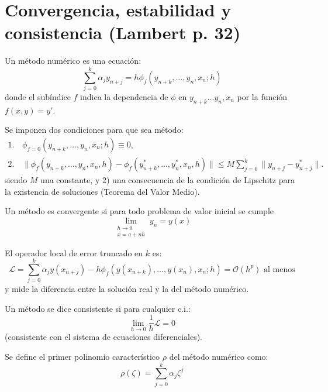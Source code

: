 \section{Convergencia, estabilidad y consistencia (Lambert p. 32)}

\begin{defi}
    Un método numérico es una ecuación:
\begin{equation}
    \sum_{j=0}^k \alpha_j y_{n+j} = h \phi_f(y_{n+k}, \dots, y_n, x_n; h) \tag{2.4}
\end{equation}
donde el subíndice $f$ indica la dependencia de $\phi$ en $y_{n+k} \dots y_n, x_n$ por la función $f(x,y) = y'$.

Se imponen dos condiciones para que sea método:
\begin{equation}
\begin{aligned}
1. & \, \phi_{f=0}(y_{n+k}, \dots, y_n, x_n; h) \equiv 0, \\
2. & \, \displaystyle \|\phi_f(y_{n+k}, \dots, y_n, x_n, h) - \phi_f(y^*_{n+k}, \dots, y^*_n, x_n, h)\| \le M \sum_{j=0}^k \|y_{n+j} - y^*_{n+j}\|.
\end{aligned}
\tag{2.5}
\end{equation}
 siendo $M$ una constante, y 2) una consecuencia de la condición de Lipschitz para la existencia de soluciones (Teorema del Valor Medio).

\end{defi} 
\begin{defi}
    Un método es convergente si para todo problema de valor inicial se cumple
$$ \lim_{\substack{h \to 0 \\ x = a+nh}} y_n = y(x) $$
\end{defi} 

\begin{defi}
    El operador local de error truncado en $k$ es:
$$ \mathscr L = \sum_{j=0}^k \alpha_j y(x_{n+j}) - h \phi_f(y(x_{n+k}), \dots, y(x_n), x_n; h) = \mathcal{O}(h^p) \text{ al menos} $$
y mide la diferencia entre la solución real y la del método numérico.
\end{defi}

\begin{defi}
    Un método se dice consistente si para cualquier c.i.:
$$ \lim_{h \to 0} \frac{1}{h}\mathscr L = 0 $$
(consistente con el sistema de ecuaciones diferenciales).
\end{defi}

\begin{defi}
    Se define el primer polinomio caracter\'istico $\rho$ del método numérico como:
$$ \rho(\zeta) = \sum_{j=0}^k \alpha_j \zeta^j $$
\end{defi} 


